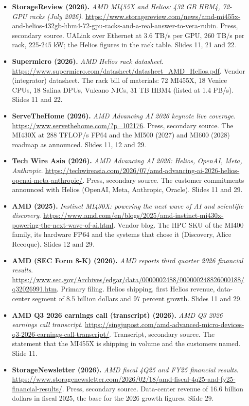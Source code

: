 \begin{itemize}[leftmargin=1.2em,itemsep=3pt]
\item \textbf{StorageReview (2026).} \textit{AMD MI455X and Helios: 432 GB HBM4, 72-GPU racks (July 2026)}. \url{https://www.storagereview.com/news/amd-mi455x-and-helios-432gb-hbm4-72-gpu-racks-and-a-real-answer-to-vera-rubin}. Press, secondary source. UALink over Ethernet at 3.6 TB/s per GPU, 260 TB/s per rack, 225-245 kW; the Helios figures in the rack table. Slides 11, 21 and 22.
\item \textbf{Supermicro (2026).} \textit{AMD Helios rack datasheet}. \url{https://www.supermicro.com/datasheet/datasheet_AMD_Helios.pdf}. Vendor (integrator) datasheet. The rack bill of materials: 72 MI455X, 18 Venice CPUs, 18 Salina DPUs, Vulcano NICs, 31 TB HBM4 (listed at 1.4 PB/s). Slides 11 and 22.
\item \textbf{ServeTheHome (2026).} \textit{AMD Advancing AI 2026 keynote live coverage}. \url{https://www.servethehome.com/?p=102176}. Press, secondary source. The MI430X at 288 TFLOP/s FP64 and the MI500 (2027) and MI600 (2028) roadmap as announced. Slides 11, 12 and 29.
\item \textbf{Tech Wire Asia (2026).} \textit{AMD Advancing AI 2026: Helios, OpenAI, Meta, Anthropic}. \url{https://techwireasia.com/2026/07/amd-advancing-ai-2026-helios-openai-meta-anthropic/}. Press, secondary source. The customer commitments announced with Helios (OpenAI, Meta, Anthropic, Oracle). Slides 11 and 29.
\item \textbf{AMD (2025).} \textit{Instinct MI430X: powering the next wave of AI and scientific discovery}. \url{https://www.amd.com/en/blogs/2025/amd-instinct-mi430x-powering-the-next-wave-of-ai.html}. Vendor blog. The HPC SKU of the MI400 family, its hardware FP64 and the systems that chose it (Discovery, Alice Recoque). Slides 12 and 29.
\item \textbf{AMD (SEC Form 8-K) (2026).} \textit{AMD reports third quarter 2026 financial results}. \url{https://www.sec.gov/Archives/edgar/data/0000002488/000000248826000188/q32026991.htm}. Primary filing. Helios shipping, first Helios revenue, data-center segment of 8.5 billion dollars and 97 percent growth. Slides 11 and 29.
\item \textbf{AMD Q3 2026 earnings call (transcript) (2026).} \textit{AMD Q3 2026 earnings call transcript}. \url{https://singjupost.com/amd-advanced-micro-devices-q3-2026-earnings-call-transcript/}. Transcript, secondary source. The statement that the MI455X is shipping in volume and the customers named. Slide 11.
\item \textbf{StorageNewsletter (2026).} \textit{AMD fiscal 4Q25 and FY25 financial results}. \url{https://www.storagenewsletter.com/2026/02/18/amd-fiscal-4q25-and-fy25-financial-results/}. Press, secondary source. Data-center revenue of 16.6 billion dollars in fiscal 2025, the base for the 2026 growth figures. Slide 29.

\end{itemize}

